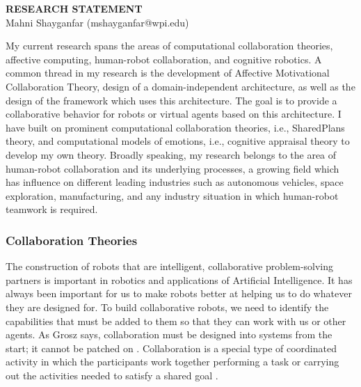 \documentclass[a4paper, 10pt]{article}
\begin{document}
\thispagestyle{fancy}

\lhead{}
\rhead{}

\renewcommand{\headrulewidth}{0pt} 
\renewcommand{\footrulewidth}{0pt} 

\pagestyle{fancy}

\rhead{\textcolor{gray}{\thepage/\totalpages{}}}

\begin{small}

\begin{center}
{\LARGE \bf RESEARCH STATEMENT}\\
\vspace*{0.1cm}
{\normalsize Mahni Shayganfar (mshayganfar@wpi.edu)}
\end{center}

My current research spans the areas of computational collaboration theories,
affective computing, human-robot collaboration, and cognitive robotics. A
common thread in my research is the development of Affective Motivational
Collaboration Theory, design of a domain-independent architecture, as well as
the design of the framework which uses this architecture. The goal is to provide
a collaborative behavior for robots or virtual agents based on this
architecture. I have built on prominent computational collaboration theories,
i.e., SharedPlans theory, and computational models of emotions, i.e., cognitive
appraisal theory to develop my own theory. Broadly speaking, my research belongs
to the area of human-robot collaboration and its underlying processes, a growing
field which has influence on different leading industries such as autonomous
vehicles, space exploration, manufacturing, and any industry situation in which
human-robot teamwork is required.

\vspace*{-4mm}
\subsubsection*{Collaboration Theories}
\vspace*{-2mm}
The construction of robots that are intelligent, collaborative problem-solving
partners is important in robotics and applications of Artificial Intelligence.
It has always been important for us to make robots better at helping us to do
whatever they are designed for. To build collaborative robots, we need to
identify the capabilities that must be added to them so that they can work with
us or other agents. As Grosz says, collaboration must be designed into systems
from the start; it cannot be patched on \cite{grosz:collaborative-systems}.
Collaboration is a special type of coordinated activity in which the
participants work together performing a task or carrying out the activities
needed to satisfy a shared goal \cite{grosz:collaboration}. 


\end{small}
\end{document}
